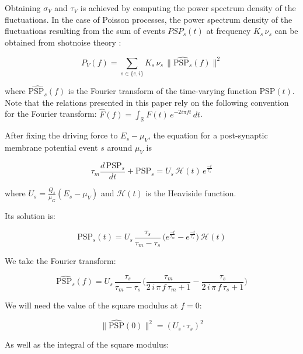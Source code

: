 \documentclass[8pt, colorlinks, a4paper]{article}
\begin{document}
Obtaining \( \sigma_V\) and \(\tau_V\) is achieved by computing the
power spectrum density of the fluctuations. In the case of Poisson
processes, the power spectrum density of the fluctuations resulting
from the sum of events \(PSP_{s}(t)\) at frequency \(K_{s} \, \nu_s\)
can be obtained from shotnoise theory \cite{Daley2007}:

\begin{equation}
 P_V(f)  = \sum_{s \in \{e,i\}} K_s \, \nu_{s} \, \| \hat{\mathrm{PSP}_s}(f) \|^2
\end{equation}

where \(\hat{\mathrm{PSP}_s}(f)\) is the Fourier transform of the
time-varying function \(\mathrm{PSP}(t)\). Note that the relations
presented in this paper rely on the following convention for the
Fourier transform: \( \hat{F}(f) = \int_\mathbb{R} F(t) \, e^{- 2 i
\pi f t} \, dt\).

After fixing the driving force to \(E_s - \mu_V\), the equation for a
 post-synaptic membrane potential event \(s\) around \(\mu_V\) is

\begin{equation}
 \tau_m \frac{d \, \mathrm{PSP}_s }{dt} + \mathrm{PSP}_s = U_s \, \mathcal{H}(t) \, e^{\frac{-t}{\tau_s}}
\end{equation}

where \( U_s = \frac{Q_s}{\mu_G} (E_s - \mu_V) \) and \(
\mathcal{H}(t) \) is the Heaviside function.

Its solution is:

\begin{equation}
\mathrm{PSP}_s(t)  = U_s \, \frac{\tau_s}{\tau_m - \tau_s} \, \big( 
e^{\frac{-t}{\tau_m}} - e^{\frac{-t}{\tau_s}} \big) \, \mathcal{H}(t)
\end{equation}

We take the Fourier transform:

\begin{equation}
\hat{\mathrm{PSP}_s}(f) = U_s \, \frac{\tau_s}{\tau_m - \tau_s} \, 
\big(
\frac{\tau_{m}}{2 \, i  \,  \pi \, f \, \tau_{m} +1} 
- \frac{\tau_s}{2 \, i  \,  \pi \, f \, \tau_s +1} \big)
\end{equation}

We will need the value of the square modulus at \(f=0\):

\begin{equation}
\label{eq:psp0}
\| \hat{\mathrm{PSP}}(0) \|^2 = (U_s \cdot \tau_s)^2
\end{equation}

As well as the integral of the square modulus:
\end{document}
